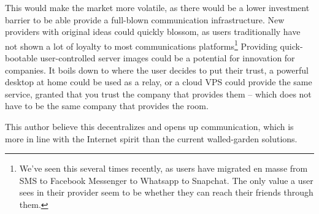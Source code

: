 This would make the market more volatile, as there would be a lower investment barrier to be able provide a full-blown communication infrastructure. New providers with original ideas could quickly blossom, as users traditionally have not shown a lot of loyalty to most communications platforms\footnote{We've seen this several times recently, as users have migrated en masse from SMS to Facebook Messenger to Whatsapp to Snapchat. The only value a user sees in their provider seem to be whether they can reach their friends through them.} Providing quick-bootable user-controlled server images could be a potential for innovation for companies. It boils down to where the user decides to put their trust, a powerful desktop at home could be used as a relay, or a cloud VPS could provide the same service, granted that you trust the company that provides them -- which does not have to be the same company that provides the room.

This author believe this decentralizes and opens up communication, which is more in line with the Internet spirit than the current walled-garden solutions.
